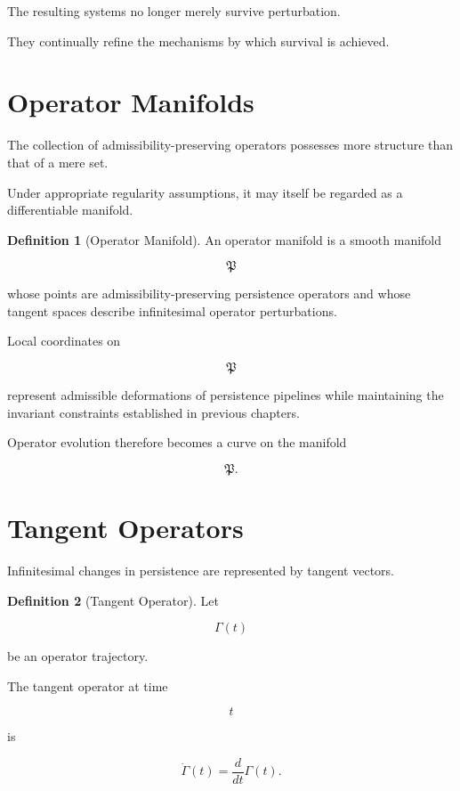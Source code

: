 \documentclass[11pt]{book}
\numberwithin{equation}{chapter}
\theoremstyle{definition}
\newtheorem{definition}{Definition}[chapter]
\theoremstyle{plain}
\begin{document}
The resulting systems no longer merely survive perturbation.

They continually refine the mechanisms by which survival is achieved.

\section{Operator Manifolds}

The collection of admissibility-preserving operators possesses more
structure than that of a mere set.

Under appropriate regularity assumptions, it may itself be regarded as
a differentiable manifold.

\begin{definition}[Operator Manifold]

An operator manifold is a smooth manifold

\[
\mathfrak P
\]

whose points are admissibility-preserving persistence operators and
whose tangent spaces describe infinitesimal operator perturbations.

\end{definition}

Local coordinates on

\[
\mathfrak P
\]

represent admissible deformations of persistence pipelines while
maintaining the invariant constraints established in previous
chapters.

Operator evolution therefore becomes a curve on the manifold

\[
\mathfrak P.
\]

\section{Tangent Operators}

Infinitesimal changes in persistence are represented by tangent
vectors.

\begin{definition}[Tangent Operator]

Let

\[
\Gamma(t)
\]

be an operator trajectory.

The tangent operator at time

\[
t
\]

is

\[
\dot{\Gamma}(t)
=
\frac{d}{dt}\Gamma(t).
\]

\end{definition}
\end{document}
